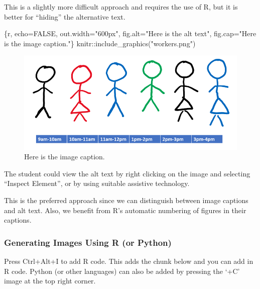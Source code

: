 \documentclass[
  letterpaper,
]{article}
\newenvironment{Shaded}{\begin{snugshade}}{\end{snugshade}}
\newcommand{\InformationTok}[1]{\textcolor[rgb]{0.37,0.37,0.37}{#1}}
\numberwithin{equation}{section}
\numberwithin{figure}{section}
\theoremstyle{break}
\begin{document}
This is a slightly more difficult approach and requires the use of R,
but it is better for ``hiding'' the alternative text.

\begin{Shaded}
\begin{Highlighting}[]
\InformationTok{\textasciigrave{}\textasciigrave{}\textasciigrave{}\{r, echo=FALSE, out.width="600px", fig.alt="Here is the alt text",}
\InformationTok{    fig.cap="Here is the image caption."\}}
\InformationTok{    knitr::include\_graphics("workers.png")}
\InformationTok{\textasciigrave{}\textasciigrave{}\textasciigrave{}}
\end{Highlighting}
\end{Shaded}

\begin{figure}[H]

{\centering \includegraphics[width=6.25in,height=\textheight,keepaspectratio]{workers.png}

}

\caption{Here is the image caption.}

\end{figure}%

The student could view the alt text by right clicking on the image and
selecting ``Inspect Element'', or by using suitable assistive
technology.

This is the preferred approach since we can distinguish between image
captions and alt text. Also, we benefit from R's automatic numbering of
figures in their captions.

\subsubsection{Generating Images Using R (or
Python)}\label{generating-images-using-r-or-python}

Press Ctrl+Alt+I to add R code. This adds the chunk below and you can
add in R code. Python (or other languages) can also be added by pressing
the `+C' image at the top right corner.
\end{document}
